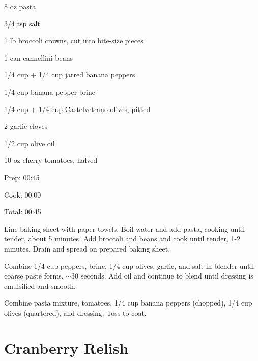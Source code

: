 \documentclass[oneside]{book}  %
\def\thisrecipe{}  %
\newcommand{\recipe}[1]{\section{#1}\def\thisrecipe{: #1}} %
\newcommand{\about}{$\sim$}
\begin{document}
\begin{IT}
  \begin{ingredients}
    \item[8 oz] pasta
    \item[3/4 tsp] salt
    \item[1 lb] broccoli crowns, cut into bite-size pieces
    \item[1 can] cannellini beans
    \item[1/4 cup + 1/4 cup] jarred banana peppers
    \item[1/4 cup] banana pepper brine
    \item[1/4 cup + 1/4 cup] Castelvetrano olives, pitted
    \item[2] garlic cloves
    \item[1/2 cup] olive oil
    \item[10 oz] cherry tomatoes, halved
  \end{ingredients}

  \switchcolumn

  \begin{timeline}
    \item[Prep:]  00:45
    \item[Cook:]  00:00
    \item[Total:] 00:45
  \end{timeline}
\end{IT}

\begin{directions}
  \item Line baking sheet with paper towels. Boil water and add pasta, cooking
  until tender, about 5 minutes. Add broccoli and beans and cook until tender,
  1-2 minutes. Drain and spread on prepared baking sheet.

  \item Combine 1/4 cup peppers, brine, 1/4 cup olives, garlic, and salt in
  blender until coarse paste forms, \about 30 seconds. Add oil and continue to
  blend until dressing is emulsified and smooth.

  \item Combine pasta mixture, tomatoes, 1/4 cup banana peppers (chopped), 1/4
  cup olives (quartered), and dressing. Toss to coat.
\end{directions}
\recipe{Cranberry Relish} \label{recipe:cranberry_relish} %
\end{document}
